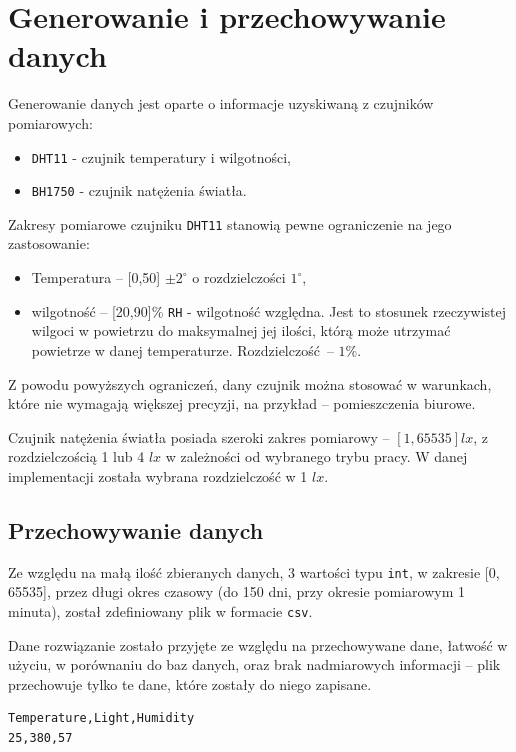 \section{Generowanie i przechowywanie danych}
Generowanie danych jest oparte o informacje uzyskiwaną z 
czujników pomiarowych:
\begin{itemize}
  \item \texttt{DHT11} - czujnik temperatury i wilgotności,
  \item \texttt{BH1750} - czujnik natężenia światła.
\end{itemize}
Zakresy pomiarowe czujniku \texttt{DHT11} stanowią pewne ograniczenie
na jego zastosowanie:
\begin{itemize}
  \item Temperatura -- [0,50] $\pm 2^\circ$ o rozdzielczości $1^\circ$,
  \item wilgotność -- [20,90]\% \texttt{RH} - wilgotność względna. 
    Jest to stosunek rzeczywistej wilgoci w powietrzu do maksymalnej jej ilości, 
    którą może utrzymać powietrze w danej temperaturze.
    Rozdzielczość -- $1\%$.
\end{itemize}
Z powodu powyższych ograniczeń, dany czujnik można stosować w warunkach, które
nie wymagają większej precyzji, na przykład -- pomieszczenia biurowe.

Czujnik natężenia światła posiada szeroki zakres pomiarowy -- $[1,65535] lx$,
z rozdzielczością 1 lub 4 $lx$ w zależności od wybranego trybu pracy. 
W danej implementacji została wybrana rozdzielczość w 1 $lx$.

\subsection{Przechowywanie danych}
Ze względu na małą ilość zbieranych danych, 3 wartości typu \texttt{int}, w zakresie
[0, 65535], przez długi okres czasowy (do 150 dni, przy okresie pomiarowym 1 minuta), 
został zdefiniowany plik w formacie \texttt{csv}.

Dane rozwiązanie zostało przyjęte ze względu na 
przechowywane dane, łatwość w użyciu, w porównaniu do baz danych, oraz 
brak nadmiarowych informacji -- plik przechowuje tylko te dane, 
które zostały do niego zapisane.

\begin{lstlisting}[frame=single, basicstyle=\ttfamily\small,
caption={Definicja pliku \texttt{csv} z przykładowymi danymi}]
Temperature,Light,Humidity
25,380,57
\end{lstlisting}

